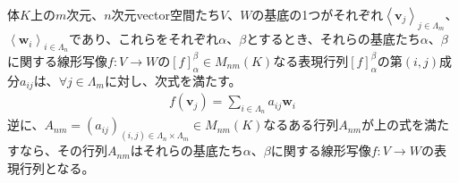 \documentclass[dvipdfmx]{jsarticle}
\begin{document}
\begin{thm}
\label{2.1.5.4}
体$K$上の$m$次元、$n$次元vector空間たち$V$、$W$の基底の1つがそれぞれ$\left\langle \mathbf{v}_{j} \right\rangle_{j \in \varLambda_{m}}$、$\left\langle \mathbf{w}_{i} \right\rangle_{i \in \varLambda_{n}}$であり、これらをそれぞれ$\alpha$、$\beta$とするとき、それらの基底たち$\alpha 、\beta$に関する線形写像$f:V \rightarrow W$の$[ f]^{\beta}_{\alpha} \in M_{nm}(K)$なる表現行列$[ f]^{\beta}_{\alpha}$の第$(i,j)$成分$a_{ij}$は、$\forall j \in \varLambda_{m}$に対し、次式を満たす。
\begin{align*}
f\left( \mathbf{v}_{j} \right) = \sum_{i \in \varLambda_{n}} {a_{ij}\mathbf{w}_{i}}
\end{align*}
逆に、$A_{nm} = \left( a_{ij} \right)_{(i,j) \in \varLambda_{n} \times \varLambda_{m}} \in M_{nm}(K)$なるある行列$A_{nm}$が上の式を満たすなら、その行列$A_{nm}$はそれらの基底たち$\alpha $、$\beta$に関する線形写像$f:V \rightarrow W$の表現行列となる。
\end{thm}
\end{document}
